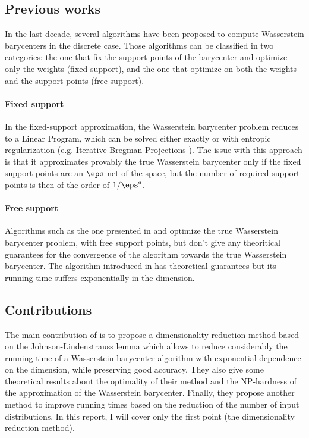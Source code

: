 \documentclass[11pt,a4paper]{article}
\begin{document}
\subsection{Previous works}

In the last decade, several algorithms have been proposed to compute Wasserstein barycenters in the discrete case. Those algorithms can be classified in two categories: the one that fix the support points of the barycenter and optimize only the weights (fixed support), and the one that optimize on both the weights and the support points (free support).

\paragraph{Fixed support} In the fixed-support approximation, the Wasserstein barycenter problem reduces to a Linear Program, which can be solved either exactly or with entropic regularization (e.g. Iterative Bregman Projections \cite{benamou_iterative_2015}). The issue with this approach is that it approximates provably the true Wasserstein barycenter only if the fixed support points are an $\eps$-net of the space, but the number of required support points is then of the order of $1 / \eps^d$.

\paragraph{Free support} Algorithms such as the one presented in \cite{cuturi_fast_2014} and \cite{ye_fast_2017} optimize the true Wasserstein barycenter problem, with free support points, but don't give any theoritical guarantees for the convergence of the algorithm towards the true Wasserstein barycenter. The algorithm introduced in \cite{altschuler_wasserstein_2020} has theoretical guarantees but its running time suffers exponentially in the dimension.

\subsection{Contributions}

The main contribution of \cite{izzo_dimensionality_2021} is to propose a dimensionality reduction method based on the Johnson-Lindenstrauss lemma \cite{beals_extensions_1984} which allows to reduce considerably the running time of a Wasserstein barycenter algorithm with exponential dependence on the dimension, while preserving good accuracy. They also give some theoretical results about the optimality of their method and the NP-hardness of the approximation of the Wasserstein barycenter. Finally, they propose another method to improve running times based on the reduction of the number of input distributions. In this report, I will cover only the first point (the dimensionality reduction method).
\end{document}
